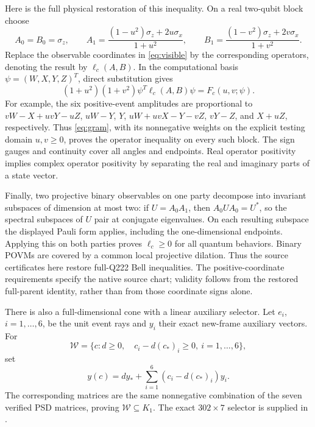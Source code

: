 \documentclass[11pt]{article}
\begin{document}
Here is the full physical restoration of this inequality.  On a real
two-qubit block choose
\[
 A_0=B_0=\sigma_z,\qquad
 A_1=\frac{(1-u^2)\sigma_z+2u\sigma_x}{1+u^2},\qquad
 B_1=\frac{(1-v^2)\sigma_z+2v\sigma_x}{1+v^2}.
\]
Replace the observable coordinates in \eqref{eq:visible} by the
corresponding operators, denoting the result by $\ell_c(A,B)$.
In the computational basis $\psi=(W,X,Y,Z)^T$, direct substitution gives
\begin{equation}
 (1+u^2)(1+v^2)\psi^T\ell_c(A,B)\psi=F_c(u,v;\psi).
 \label{eq:physicalrestoration}
\end{equation}
For example, the six positive-event amplitudes are proportional to
$vW-X+uvY-uZ$, $uW-Y$, $Y$,
$uW+uvX-Y-vZ$, $vY-Z$, and $X+uZ$, respectively.
Thus \eqref{eq:gram}, with its nonnegative weights on the explicit testing
domain $u,v\geq0$, proves the operator inequality on every such block.
The sign gauges and continuity cover all angles and endpoints.  Real
operator positivity implies complex operator positivity by separating
the real and imaginary parts of a state vector.

Finally, two projective binary observables on one party decompose into
invariant subspaces of dimension at most two: if $U=A_0A_1$, then
$A_0UA_0=U^*$, so the spectral subspaces of $U$ pair at conjugate
eigenvalues.  On each resulting subspace the displayed Pauli form
applies, including the one-dimensional endpoints.  Applying this on
both parties proves $\ell_c\geq0$ for all quantum behaviors.  Binary
POVMs are covered by a common local projective dilation.  Thus the
source certificates here restore full-Q222 Bell inequalities.
The positive-coordinate requirements specify the native source chart;
validity follows from the restored full-parent identity, rather than
from those coordinate signs alone.

There is also a full-dimensional cone with a linear auxiliary selector.
Let $e_i$, $i=1,\ldots,6$, be the unit event rays and $y_i$ their exact
new-frame auxiliary vectors.  For
\begin{equation}
 \mathcal W=\{c:d\geq0,\quad c_i-d(c_*)_i\geq0,
                           \ i=1,\ldots,6\},
 \label{eq:chamber}
\end{equation}
set
\begin{equation}
 y(c)=d y_*+\sum_{i=1}^6(c_i-d(c_*)_i)y_i.
 \label{eq:chamberselector}
\end{equation}
The corresponding matrices are the same nonnegative combination of the
seven verified PSD matrices, proving $\mathcal W\subseteq K_1$.
The exact $302\times7$ selector is supplied in
.
\end{document}
